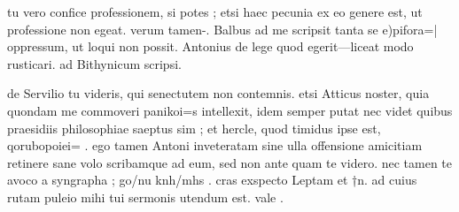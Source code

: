 


 tu vero confice professionem, si potes ; etsi haec pecunia ex eo genere est, ut professione non egeat. verum tamen-. Balbus ad me scripsit tanta se e)pifora=| oppressum, ut loqui non possit. Antonius de lege quod egerit—liceat modo rusticari. ad Bithynicum scripsi.

 de Servilio tu videris, qui senectutem non contemnis. etsi Atticus noster, quia quondam me commoveri panikoi=s intellexit, idem semper putat nec videt quibus praesidiis philosophiae saeptus sim ; et hercle, quod timidus ipse est, qorubopoiei= . ego tamen Antoni inveteratam sine ulla offensione amicitiam retinere sane volo scribamque ad eum, sed non ante quam te videro. nec tamen te avoco a syngrapha ; go/nu knh/mhs . cras exspecto Leptam et †n. ad cuius rutam puleio mihi tui sermonis utendum est. vale .
